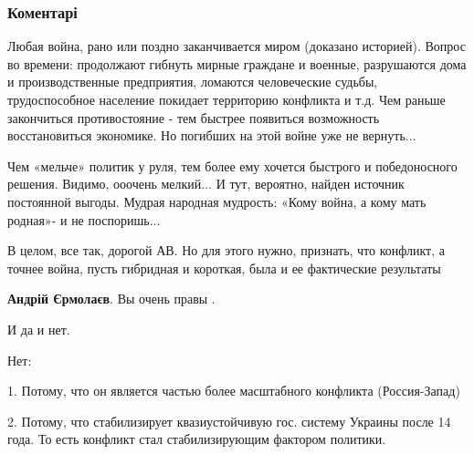  
 
 
 
 
\subsubsection{Коментарі}
\label{sec:19_10_2021.fb.ermolaev_andrej.1.konflikt_i_zamorozki.cmt}

\begin{itemize} %

Любая война, рано или поздно заканчивается миром (доказано историей). Вопрос во
времени: продолжают гибнуть мирные граждане и военные, разрушаются дома и
производственные предприятия, ломаются человеческие судьбы, трудоспособное
население покидает территорию конфликта и т.д. Чем раньше закончиться
противостояние - тем быстрее появиться возможность восстановиться экономике. Но
погибших на этой войне уже не вернуть...


Чем «мельче» политик у руля, тем более ему хочется быстрого и победоносного
решения. Видимо, ооочень мелкий... И тут, вероятно, найден источник постоянной
выгоды. Мудрая народная мудрость: «Кому война, а кому мать родная»- и не
поспоришь...


В целом, все так, дорогой АВ. Но для этого нужно, признать, что конфликт, а
точнее война, пусть гибридная и короткая, была и ее фактические результаты


\textbf{Андрій Єрмолаєв}. Вы очень правы .


И да и нет.

Нет:

1. Потому, что он является частью более масштабного конфликта (Россия-Запад)

2. Потому, что стабилизирует квазиустойчивую гос. систему Украины после 14
года. То есть конфликт стал стабилизирующим фактором политики.

\end{itemize} %
